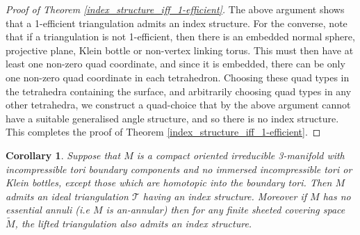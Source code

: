 \documentclass[12pt]{amsart}
\newtheorem{cor}[thm]{Corollary}
\theoremstyle{definition}
\theoremstyle{remark}
\def\tri{\mathcal{T}}
\begin{document}
\begin{proof}[Proof of Theorem \ref{index_structure_iff_1-efficient}]
The above argument shows that a 1-efficient triangulation admits an index structure. For the converse, note that if a triangulation is not 1-efficient, then there is an embedded normal sphere, projective plane, Klein bottle or non-vertex linking torus. This must then have at least one non-zero quad coordinate, and since it is embedded, there can be only one non-zero quad coordinate in each tetrahedron. Choosing these quad types in the tetrahedra containing the surface, and arbitrarily choosing quad types in any other tetrahedra, we construct a quad-choice that by the above argument cannot have a suitable generalised angle structure, and so there is no index structure. This completes the proof of Theorem \ref{index_structure_iff_1-efficient}. \end{proof}



\begin{cor}\label{atoroidal=>1-efficient}
Suppose that $M$ is a compact  oriented irreducible 3-manifold with incompressible tori boundary components and no immersed incompressible tori or Klein bottles, except those which are homotopic into the boundary tori. Then $M$ admits an ideal triangulation $\tri$ having an index structure. Moreover if $M$ has no essential annuli (i.e $M$ is an-annular) then for any finite sheeted covering space $\widetilde M$, the lifted triangulation also admits an index structure.  
\end{cor}
\end{document}
